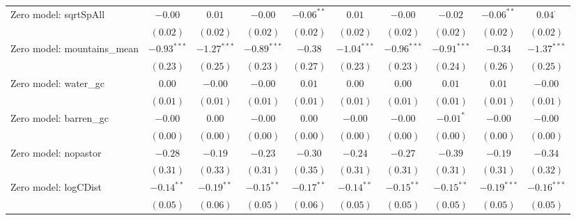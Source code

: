 \begin{sidewaystable}
\begin{center}
{\begin{tabular}{l c c c c c c c c c}
Zero model: sqrtSpAll          & $-0.00$       & $0.01$        & $-0.00$       & $-0.06^{**}$  & $0.01$         & $-0.00$       & $-0.02$       & $-0.06^{**}$   & $0.04^{\cdot}$ \\
                               & $(0.02)$      & $(0.02)$      & $(0.02)$      & $(0.02)$      & $(0.02)$       & $(0.02)$      & $(0.02)$      & $(0.02)$       & $(0.02)$       \\
Zero model: mountains\_mean    & $-0.93^{***}$ & $-1.27^{***}$ & $-0.89^{***}$ & $-0.38$       & $-1.04^{***}$  & $-0.96^{***}$ & $-0.91^{***}$ & $-0.34$        & $-1.37^{***}$  \\
                               & $(0.23)$      & $(0.25)$      & $(0.23)$      & $(0.27)$      & $(0.23)$       & $(0.23)$      & $(0.24)$      & $(0.26)$       & $(0.25)$       \\
Zero model: water\_gc          & $0.00$        & $-0.00$       & $-0.00$       & $0.01$        & $0.00$         & $0.00$        & $0.01$        & $0.01$         & $-0.00$        \\
                               & $(0.01)$      & $(0.01)$      & $(0.01)$      & $(0.01)$      & $(0.01)$       & $(0.01)$      & $(0.01)$      & $(0.01)$       & $(0.01)$       \\
Zero model: barren\_gc         & $-0.00$       & $0.00$        & $-0.00$       & $0.00$        & $-0.00$        & $-0.00$       & $-0.01^{*}$   & $-0.00$        & $-0.00$        \\
                               & $(0.00)$      & $(0.00)$      & $(0.00)$      & $(0.00)$      & $(0.00)$       & $(0.00)$      & $(0.00)$      & $(0.00)$       & $(0.00)$       \\
Zero model: nopastor           & $-0.28$       & $-0.19$       & $-0.23$       & $-0.30$       & $-0.24$        & $-0.27$       & $-0.39$       & $-0.19$        & $-0.34$        \\
                               & $(0.31)$      & $(0.33)$      & $(0.31)$      & $(0.35)$      & $(0.31)$       & $(0.31)$      & $(0.31)$      & $(0.31)$       & $(0.32)$       \\
Zero model: logCDist           & $-0.14^{**}$  & $-0.19^{**}$  & $-0.15^{**}$  & $-0.17^{**}$  & $-0.14^{**}$   & $-0.15^{**}$  & $-0.15^{**}$  & $-0.19^{***}$  & $-0.16^{***}$  \\
                               & $(0.05)$      & $(0.06)$      & $(0.05)$      & $(0.06)$      & $(0.05)$       & $(0.05)$      & $(0.05)$      & $(0.05)$       & $(0.05)$       \\

\end{tabular}}
\end{center}
\end{sidewaystable}
